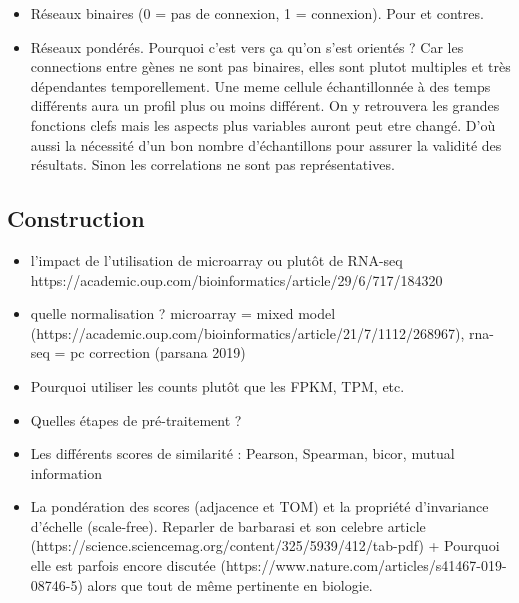 \begin{itemize}
    \item Réseaux binaires (0 = pas de connexion, 1 = connexion). Pour et contres.
    \item Réseaux pondérés. Pourquoi c'est vers ça qu'on s'est orientés ? Car les connections entre gènes ne sont pas binaires, elles sont plutot multiples et très dépendantes temporellement. Une meme cellule échantillonnée à des temps différents aura un profil plus ou moins différent. On y retrouvera les grandes fonctions clefs mais les aspects plus variables auront peut etre changé. D'où aussi la nécessité d'un bon nombre d'échantillons pour assurer la validité des résultats. Sinon les correlations ne sont pas représentatives.
\end{itemize}

\subsection{Construction}
\begin{itemize}
\item l'impact de l'utilisation de microarray ou plutôt de RNA-seq https://academic.oup.com/bioinformatics/article/29/6/717/184320
\item quelle normalisation ? microarray = mixed model (https://academic.oup.com/bioinformatics/article/21/7/1112/268967), rna-seq = pc correction (parsana 2019)
\item Pourquoi utiliser les counts plutôt que les FPKM, TPM, etc.
\item Quelles étapes de pré-traitement ?
\item Les différents scores de similarité : Pearson, Spearman, bicor, mutual information
\item La pondération des scores (adjacence et TOM) et la propriété d'invariance d'échelle (scale-free). Reparler de barbarasi et son celebre article (https://science.sciencemag.org/content/325/5939/412/tab-pdf) + Pourquoi elle est parfois encore discutée (https://www.nature.com/articles/s41467-019-08746-5) alors que tout de même pertinente en biologie. 
\end{itemize}
